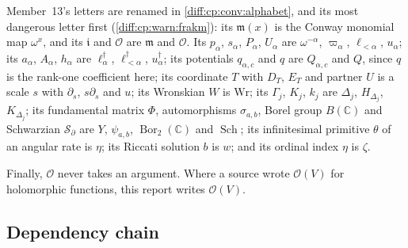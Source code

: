 \documentclass[11pt,letterpaper]{article}
\numberwithin{equation}{section}
\theoremstyle{definition}
\theoremstyle{remark}
\newcommand{\C}{\mathbb C}
\newcommand{\der}{\partial}
\newcommand{\Ofin}{\mathcal O}
\newcommand{\mm}{\mathfrak m}
\newcommand{\Hol}{\mathscr O}
\newcommand{\Sch}{\operatorname{Sch}}
\newcommand{\Bor}{\operatorname{Bor}}
\begin{document}
\begin{warning}
Member~13's letters are renamed in \cref{diff:cp:conv:alphabet}, and its most
dangerous letter first (\cref{diff:cp:warn:frakm}): its $\mathfrak m(x)$ is the
Conway monomial map $\omega^{x}$, and its $\mathfrak i$ and $\mathcal O$ are
$\mm$ and $\Ofin$. Its $p_{\alpha}$, $s_{\alpha}$, $P_{\alpha}$, $U_{\alpha}$ are
$\omega^{-\alpha}$, $\varpi_{\alpha}$, $\ell_{<\alpha}$, $u_{\alpha}$; its $a_{\alpha}$,
$A_{\alpha}$, $h_{\alpha}$ are $\ell_{\alpha}^{\dagger}$, $\ell_{<\alpha}^{\dagger}$,
$u_{\alpha}^{\dagger}$; its potentials $q_{\alpha,c}$ and $q$ are $Q_{\alpha,c}$ and
$Q$, since $q$ is the rank-one coefficient here; its coordinate $T$ with $D_{T}$,
$E_{T}$ and partner $U$ is a scale $s$ with $\der_{s}$, $s\der_{s}$ and $u$; its
Wronskian $W$ is $\mathrm{Wr}$; its $\Gamma_{j}$, $K_{j}$, $k_{j}$ are $\Delta_{j}$,
$H_{\Delta_{j}}$, $K_{\Delta_{j}}$; its fundamental matrix $\Phi$, automorphisms
$\sigma_{a,b}$, Borel group $B(\C)$ and Schwarzian $\mathcal S_{\der}$ are $Y$,
$\psi_{a,b}$, $\Bor_{2}(\C)$ and $\Sch$; its infinitesimal primitive $\theta$ of
an angular rate is $\eta$; its Riccati solution $b$ is $w$; and its ordinal
index $\eta$ is $\zeta$.

Finally, $\Ofin$ never takes an argument. Where a source wrote
$\mathcal O(V)$ for holomorphic functions, this report writes $\Hol(V)$.
\end{warning}

\subsection*{Dependency chain}
\label{diff:sub:app:dependency}
\end{document}
